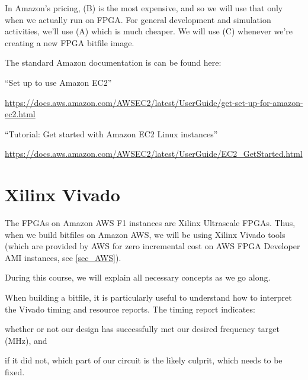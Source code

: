 In Amazon's pricing, (B) is the most expensive, and so we will use
that only when we actually run on FPGA.  For general development and
simulation activities, we'll use (A) which is much cheaper.  We will
use (C) whenever we're creating a new FPGA bitfile image.

The standard Amazon documentation is can be found here:

\begin{tightlist}

  \item ``Set up to use Amazon EC2''

    \url{https://docs.aws.amazon.com/AWSEC2/latest/UserGuide/get-set-up-for-amazon-ec2.html}

  \item ``Tutorial: Get started with Amazon EC2 Linux instances''

    \url{https://docs.aws.amazon.com/AWSEC2/latest/UserGuide/EC2_GetStarted.html}

\end{tightlist}


\section{Xilinx Vivado}

The FPGAs on Amazon AWS F1 instances are Xilinx Ultrascale FPGAs.
Thus, when we build bitfiles on Amazon AWS, we will be using Xilinx
Vivado tools (which are provided by AWS for zero incremental cost on
AWS FPGA Developer AMI instances, see \ref{sec_AWS}).

During this course, we will explain all necessary concepts as we go
along.

When building a bitfile, it is particularly useful to understand how
to interpret the Vivado timing and resource reports.  The timing
report indicates:

\begin{tightlist}

  \item whether or not our design has successfully met our desired
    frequency target (MHz), and

  \item if it did not, which part of our circuit is the likely
  culprit, which needs to be fixed.

\end{tightlist}

